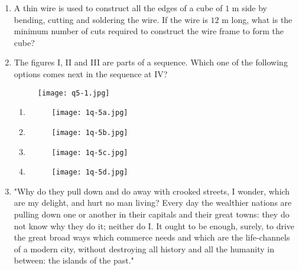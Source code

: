 \documentclass[journal,12pt,onecolumn]{article}
\theoremstyle{remark}
\begin{document}
\begin{enumerate}
\item A thin wire is used to construct all the edges of a cube of $1$ m side by bending, cutting and soldering the wire. If the wire is $12$ m long, what is the minimum number of cuts required to construct the wire frame to form the cube?

\hfill{}
\begin{enumerate}
\end{enumerate}

\item The figures  I, II and III are parts of a sequence. Which one of the following options comes next in the sequence at IV?
\begin{figure}[H]
    \centering
    \texttt{[image: q5-1.jpg]}
    \caption{}
    \label{fig:q5}
\end{figure}

\hfill{}
\begin{enumerate}
    \item \begin{figure}[H]
    \centering
    \texttt{[image: 1q-5a.jpg]}
    \caption{}
    \label{fig:q5}
\end{figure}
\item \begin{figure}[H]
    \centering
    \texttt{[image: 1q-5b.jpg]}
    \caption{}
    \label{fig:q5}
\end{figure}
\item \begin{figure}[H]
    \centering
    \texttt{[image: 1q-5c.jpg]}
    \caption{}
    \label{fig:q5}
\end{figure}
\item \begin{figure}[H]
    \centering
    \texttt{[image: 1q-5d.jpg]}
    \caption{}
    \label{fig:q5}
\end{figure}
\end{enumerate}

\item "Why do they pull down and do away with crooked streets, I wonder, which are my delight, and hurt no man living? Every day the wealthier nations are pulling down one or another in their capitals and their great towns: they do not know why they do it; neither do I. It ought to be enough, surely, to drive the great broad ways which commerce needs and which are the life-channels of a modern city, without destroying all history and all the humanity in between: the islands of the past." 


\end{enumerate}
\end{document}
